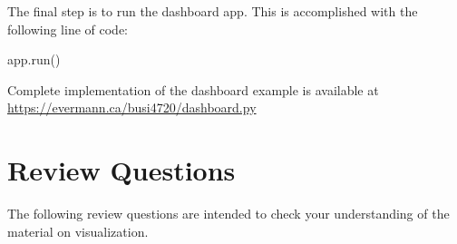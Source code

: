 The final step is to run the dashboard app. This is accomplished with the following line of code:

\begin{pythoncode}
app.run()
\end{pythoncode}

\begin{resourcebox}
Complete implementation of the dashboard example is available at
\url{https://evermann.ca/busi4720/dashboard.py} \\
\end{resourcebox}


\section{Review Questions}

The following review questions are intended to check your understanding of the material on visualization.

